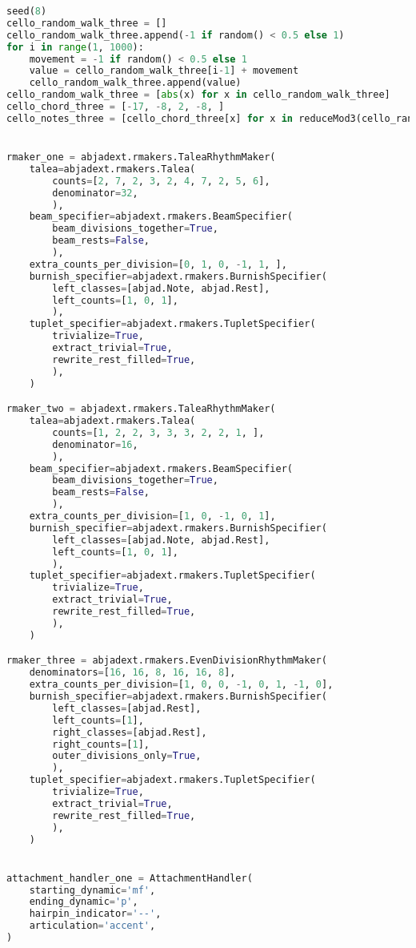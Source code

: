 \begin{lstlisting}[language=Python, caption=Four Ages of Sand Segment\_I]
seed(8)
cello_random_walk_three = []
cello_random_walk_three.append(-1 if random() < 0.5 else 1)
for i in range(1, 1000):
    movement = -1 if random() < 0.5 else 1
    value = cello_random_walk_three[i-1] + movement
    cello_random_walk_three.append(value)
cello_random_walk_three = [abs(x) for x in cello_random_walk_three]
cello_chord_three = [-17, -8, 2, -8, ]
cello_notes_three = [cello_chord_three[x] for x in reduceMod3(cello_random_walk_three)]


rmaker_one = abjadext.rmakers.TaleaRhythmMaker(
    talea=abjadext.rmakers.Talea(
        counts=[2, 7, 2, 3, 2, 4, 7, 2, 5, 6],
        denominator=32,
        ),
    beam_specifier=abjadext.rmakers.BeamSpecifier(
        beam_divisions_together=True,
        beam_rests=False,
        ),
    extra_counts_per_division=[0, 1, 0, -1, 1, ],
    burnish_specifier=abjadext.rmakers.BurnishSpecifier(
        left_classes=[abjad.Note, abjad.Rest],
        left_counts=[1, 0, 1],
        ),
    tuplet_specifier=abjadext.rmakers.TupletSpecifier(
        trivialize=True,
        extract_trivial=True,
        rewrite_rest_filled=True,
        ),
    )

rmaker_two = abjadext.rmakers.TaleaRhythmMaker(
    talea=abjadext.rmakers.Talea(
        counts=[1, 2, 2, 3, 3, 3, 2, 2, 1, ],
        denominator=16,
        ),
    beam_specifier=abjadext.rmakers.BeamSpecifier(
        beam_divisions_together=True,
        beam_rests=False,
        ),
    extra_counts_per_division=[1, 0, -1, 0, 1],
    burnish_specifier=abjadext.rmakers.BurnishSpecifier(
        left_classes=[abjad.Note, abjad.Rest],
        left_counts=[1, 0, 1],
        ),
    tuplet_specifier=abjadext.rmakers.TupletSpecifier(
        trivialize=True,
        extract_trivial=True,
        rewrite_rest_filled=True,
        ),
    )

rmaker_three = abjadext.rmakers.EvenDivisionRhythmMaker(
    denominators=[16, 16, 8, 16, 16, 8],
    extra_counts_per_division=[1, 0, 0, -1, 0, 1, -1, 0],
    burnish_specifier=abjadext.rmakers.BurnishSpecifier(
        left_classes=[abjad.Rest],
        left_counts=[1],
        right_classes=[abjad.Rest],
        right_counts=[1],
        outer_divisions_only=True,
        ),
    tuplet_specifier=abjadext.rmakers.TupletSpecifier(
        trivialize=True,
        extract_trivial=True,
        rewrite_rest_filled=True,
        ),
    )


attachment_handler_one = AttachmentHandler(
    starting_dynamic='mf',
    ending_dynamic='p',
    hairpin_indicator='--',
    articulation='accent',
)


\end{lstlisting}
